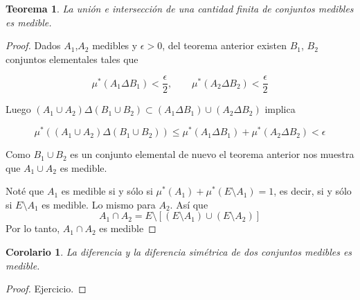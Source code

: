 \documentclass[twoside,12pt,a4 paper,openright]{book}
\newtheorem{teo}[claim]{Teorema}
\newtheorem{cor}[claim]{Corolario}
\begin{document}
\begin{teo} 
La uni\'on e intersecci\'on de una cantidad finita de conjuntos medibles es medible. 
\end{teo}
\begin{proof}
Dados $A_1$,$A_2$ medibles y $\epsilon > 0$, del teorema anterior existen $B_1$, $B_2$ conjuntos elementales tales que 

$$\mu^*(A_1 \Delta B_1) < \frac{\epsilon}{2},\quad \quad \mu^*(A_2 \Delta B_2) < \frac{\epsilon}{2}$$

Luego $(A_1\cup A_2)\Delta (B_1 \cup B_2) \subset (A_1\Delta B_1) \cup (A_2 \Delta B_2)$ implica 

$$\mu^*((A_1\cup A_2)\Delta (B_1 \cup B_2)) \leq \mu^*(A_1\Delta B_1) + \mu^*(A_2 \Delta B_2) < \epsilon$$

Como $B_1\cup B_2$ es un conjunto elemental de nuevo  el teorema anterior nos muestra que $A_1 \cup A_2$ es medible. 

Not\'e que $A_1$ es medible si y s\'olo si $\mu^*(A_1) + \mu^*(E\setminus A_1) = 1$, es decir, si y s\'olo si $E\setminus A_1$ es medible. 
Lo mismo para $A_2$. As\'i que $$A_1 \cap A_2 = E\setminus [(E\setminus A_1)\cup(E\setminus A_2) ]$$
Por lo tanto,  $A_1 \cap A_2$ es medible
\end{proof}


\begin{cor} 
La diferencia y la diferencia sim\'etrica de dos conjuntos medibles  es medible. 
\end{cor}
\begin{proof}
Ejercicio. 
\end{proof}
\end{document}
